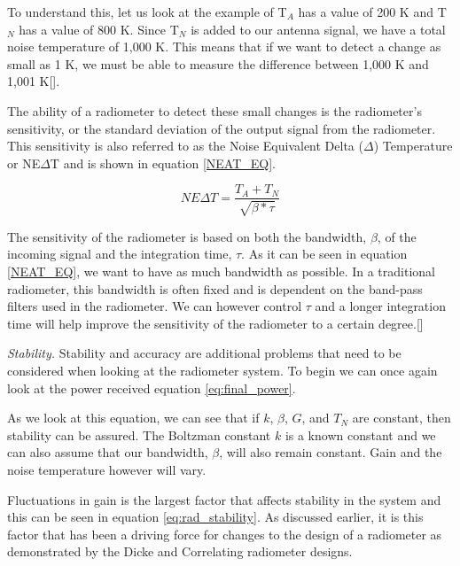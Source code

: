 To understand this, let us look at the example of T$_{A}$ has a value of 200 K and T$_{N}$ has a value of 800 K.  Since T$_{N}$ is added to our antenna signal, we have a total noise temperature of 1,000 K.  This means that if we want to detect a change as small as 1 K, we must be able to measure the difference between 1,000 K and 1,001 K[\cite{skou}].


The ability of a radiometer to detect these small changes is the radiometer's sensitivity, or the standard deviation of the output signal from the radiometer.  This sensitivity is also referred to as the Noise Equivalent Delta ($\Delta$) Temperature or NE$\Delta$T and is shown in equation \ref{NEAT_EQ}. 

\begin{equation} \label{NEAT_EQ}
NE\Delta T=\frac{T_{A}+T_{N}}{\sqrt{\beta * \tau}} 
\end{equation}

The sensitivity of the radiometer is based on both the bandwidth, $\beta$, of the incoming signal and the integration time, $\tau$.  As it can be seen in equation \ref{NEAT_EQ}, we want to have as much bandwidth as possible.  In a traditional radiometer, this bandwidth is often fixed and is dependent on the band-pass filters used in the radiometer.  We can however control $\tau$ and a longer integration time will help improve the sensitivity of the radiometer to a certain degree.[\cite{ulaby}]

\emph{Stability.}  Stability and accuracy are additional problems that need to be considered when looking at the radiometer system.  To begin we can once again look at the power received equation \ref{eq:final_power}.

As we look at this equation, we can see that if $k$, $\beta$, $G$, and $T_{N}$ are constant, then stability can be assured.  The Boltzman constant $k$ is a known constant and we can also assume that our bandwidth, $\beta$, will also remain constant.  Gain and the noise temperature however will vary.  

Fluctuations in gain is the largest factor that affects stability in the system and this can be seen in equation \ref{eq:rad_stability}.  As discussed earlier, it is this factor that has been a driving force for changes to the design of a radiometer as demonstrated by the Dicke and Correlating radiometer designs.  

